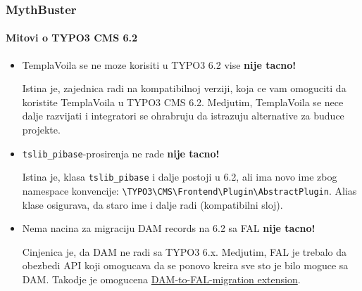 \begin{frame}[fragile]
	\frametitle{MythBuster}
	\framesubtitle{Mitovi o TYPO3 CMS 6.2}

	\begin{itemize}
		\item TemplaVoila se ne moze korisiti u TYPO3 6.2 vise
			\tabto{8cm}\color{red}\textbf{\textrightarrow nije tacno!}\color{black}

			\smaller
				Istina je, zajednica radi na kompatibilnoj verziji, koja ce vam omoguciti da koristite TemplaVoila u TYPO3 CMS 6.2. Medjutim, TemplaVoila se nece dalje razvijati i integratori se ohrabruju da istrazuju alternative za buduce projekte.
			\normalsize

		\item \texttt{tslib\_pibase}-prosirenja ne rade
			\tabto{8cm}\color{red}\textbf{\textrightarrow nije tacno!}\color{black}

			\smaller
				Istina je, klasa \texttt{tslib\_pibase} i dalje postoji u 6.2, ali ima novo ime zbog namespace konvencije: \texttt{\textbackslash TYPO3\textbackslash CMS\textbackslash Frontend\textbackslash Plugin\textbackslash AbstractPlugin}.\newline
				Alias klase osigurava, da staro ime i dalje radi (kompatibilni sloj).
			\normalsize

		\item Nema nacina za migraciju DAM records na 6.2 sa FAL
			\tabto{8cm}\color{red}\textbf{\textrightarrow nije tacno!}\color{black}

			\smaller
				Cinjenica je, da DAM ne radi sa TYPO3 6.x. Medjutim, FAL je trebalo da obezbedi API koji omogucava da se ponovo kreira sve sto je bilo moguce sa DAM. Takodje je omogucena \href{https://github.com/fnagel/t3ext-dam_falmigration}{DAM-to-FAL-migration extension}.
			\normalsize

	\end{itemize}

\end{frame}


